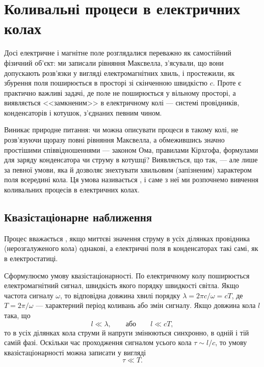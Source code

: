 
\chapter{Коливальні процеси в електричних колах}\label{\currfilebase}
\graphicspath{{\currfilebase/Pictures}}


Досі електричне і магнітне поле розглядалися переважно як самостійний фізичний об'єкт: ми записали рівняння Максвелла, з'ясували, що вони допускають
розв'язки у вигляді електромагнітних хвиль, і простежили, як збурення поля поширюється в просторі зі скінченною швидкістю $c$. Проте є практично важливі задачі, де поле не поширюється у вільному просторі, а виявляється <<замкненим>> в електричному колі --- системі провідників,
конденсаторів і котушок, з'єднаних певним чином.

Виникає природне питання: чи можна описувати процеси в такому колі, не розв'язуючи щоразу повні рівняння Максвелла, а обмежившись значно простішими
співвідношеннями --- законом Ома, правилами Кірхгофа, формулами для заряду конденсатора чи струму в котушці? Виявляється, що так, --- але лише за певної
умови, яка й дозволяє знехтувати хвильовим (запізненим) характером поля всередині кола. Ця умова називається , і саме
з неї ми розпочнемо вивчення коливальних процесів в електричних колах.

\section{Квазістаціонарне наближення}

Процес вважається , якщо миттєві значення струму в усіх ділянках провідника (нерозгалуженого кола) однакові, а електричні поля в конденсаторах такі самі, як в електростатиці.

Сформулюємо умову квазістаціонарності. По електричному колу поширюється електромагнітний сигнал, швидкість якого порядку швидкості світла. Якщо частота сигналу $\omega$, то відповідна довжина хвилі порядку $\lambda = 2\pi c/\omega = cT$, де $T = 2\pi/\omega$ --- характерний період коливань або змін сигналу. Якщо довжина кола $l$ така, що
\begin{equation}\label{eq:quasistationary_condition}
	l \ll \lambda, \qquad \text{або} \qquad l \ll cT,
\end{equation}
то в усіх ділянках кола струми й напруги змінюються синхронно, в одній і тій самій фазі. Оскільки час проходження сигналом усього кола $\tau \sim l/c$, то умову квазістаціонарності можна записати у вигляді
\begin{equation}\label{eq:quasistationary_time}
	\tau \ll T.
\end{equation}

